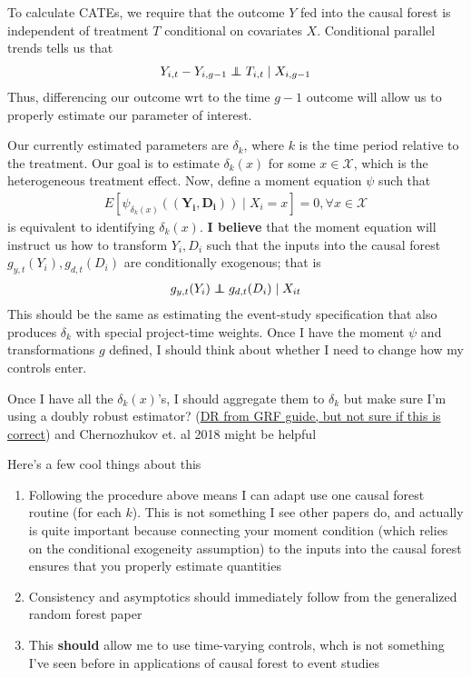 \documentclass[source/paper/main.tex]{subfiles}
\begin{document}
To calculate CATEs, we require that the outcome $Y$ fed into the causal forest is independent of treatment $T$ conditional on covariates $X$. Conditional parallel trends tells us that
\begin{align}
    Y_{i, t} - Y_{i, g-1} \independent T_{i,t} \mid X_{i, g-1}
\end{align}
Thus, differencing our outcome wrt to the time $g-1$ outcome will allow us to properly estimate our parameter of interest. 

Our currently estimated parameters are $\delta_k$, where $k$ is the time period relative to the treatment. Our goal is to estimate $\delta_k(x)$ for some $x \in \mathcal{X}$, which is the heterogeneous treatment effect. Now, define a moment equation $\psi $ such that
\begin{align}
    E[\psi_{\delta_k(x)}(( \boldsymbol{Y_i, D_i})) \mid X_i = x] = 0, \forall x \in \mathcal{X} 
\end{align}
is equivalent to identifying $\delta_k(x)$. \textbf{I believe} that the moment equation will instruct us how to transform \textbf{$Y_i, D_i$} such that the inputs into the causal forest $g_{y,t}(Y_i), g_{d,t}(D_i)$ are conditionally exogenous; that is
\begin{align}
    g_{y,t}(Y_i) \independent g_{d,t}(D_i) \mid X_{it} 
\end{align}
This should be the same as estimating the event-study specification that also produces $\delta_k$ with special project-time weights. Once I have the moment $\psi$ and transformations $g$ defined, I should think about whether I need to change how my controls enter. 

Once I have all the $\delta_k(x)$'s, I should aggregate them to $\delta_k$ but make sure I'm using a doubly robust estimator? (\href{https://grf-labs.github.io/grf/reference/get_scores.causal_forest.html}{DR from GRF guide, but not sure if this is correct}) and Chernozhukov et. al 2018 might be helpful

Here's a few cool things about this
\begin{enumerate}
    \item Following the procedure above means I can adapt use one causal forest routine (for each $k$). This is not something I see other papers do, and actually is quite important because connecting your moment condition (which relies on the conditional exogeneity assumption) to the inputs into the causal forest ensures that you properly estimate quantities
    \item Consistency and asymptotics should immediately follow from the generalized random forest paper
    \item This \textbf{should} allow me to use time-varying controls, whch is not something I've seen before in applications of causal forest to event studies
\end{enumerate}
\end{document}
